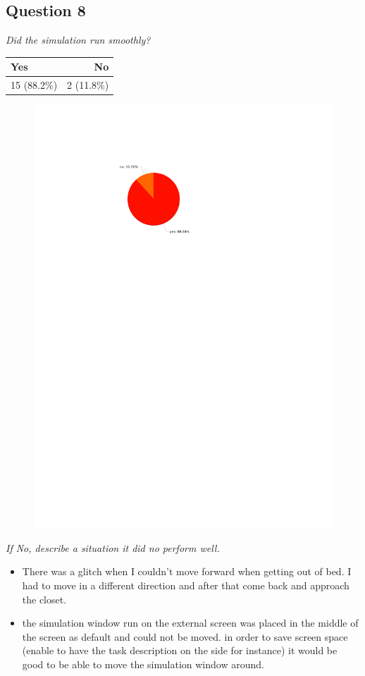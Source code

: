 \subsection{Question 8}
\emph{Did the simulation run smoothly?}
\begin{table}[H]
	\begin{center}
		\small \begin{tabular*}{0.35\columnwidth}{lr}
			\\ \hline \hline
			Yes & No \\ \hline \hline

		 	15 (88.2\%) & 2 (11.8\%)\\ \hline
		\end{tabular*}
	\end{center}
\end{table}

\begin{figure}[H]
	\centering
	\includegraphics[width=0.6\linewidth]{gfx/Chapter_EvaluationResults/ALFTask/question8}
\end{figure}

\emph{If No, describe a situation it did no perform well.}
\begin{itemize}
	\item There was a glitch when I couldn't move forward when getting out of bed. I had to move in a different direction and after that come back and approach the closet.
	\item the simulation window run on the external screen was placed in the middle of the screen as default and could not be moved. in order to save screen space (enable to have the task description on the side for instance) it would be good to be able to move the simulation window around.
\end{itemize}

